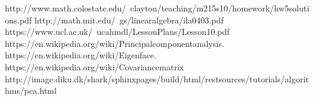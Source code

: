\documentclass{article}
\begin{document}


http://www.math.colostate.edu/~clayton/teaching/m215s10/homework/hw5solutions.pdf\newline
http://math.mit.edu/~gs/linearalgebra/ila0403.pdf\newline
https://www.ucl.ac.uk/~ucahmdl/LessonPlans/Lesson10.pdf\newline
https://en.wikipedia.org/wiki/Principalcomponentanalysis.\newline
https://en.wikipedia.org/wiki/Eigenface.\newline
https://en.wikipedia.org/wiki/Covariancematrix\newline
http://image.diku.dk/shark/sphinxpages/build/html/restsources/tutorials/algorithms/pca.html
\newline
\end{document}
